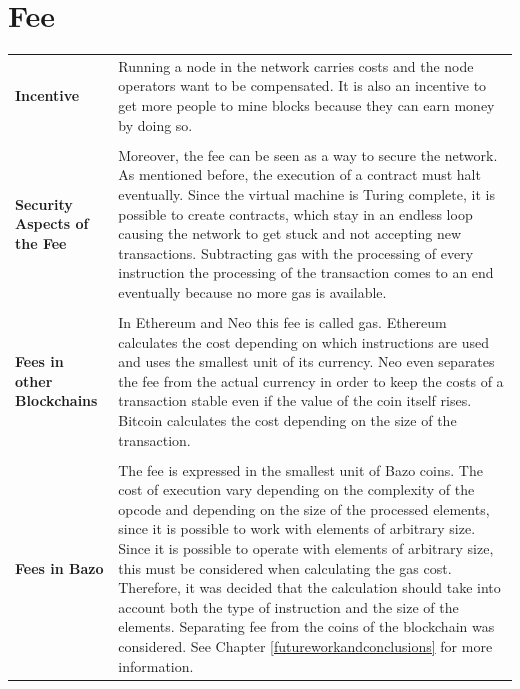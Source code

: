 \section{Fee} \label{fee}
\begin{tabular}[t]{ p{3cm} p{12.5cm}}
\raggedright
\textbf{Incentive} &
Running a node in the network carries costs and the node operators want to be compensated. It is also an incentive to get more people to mine blocks because they can earn money by doing so. \\ \\

\raggedright
\textbf{Security Aspects of the Fee} &
Moreover, the fee can be seen as a way to secure the network. As mentioned before, the execution of a contract must halt eventually. Since the virtual machine is Turing complete, it is possible to create contracts, which stay in an endless loop causing the network to get stuck and not accepting new transactions. Subtracting gas with the processing of every instruction the processing of the transaction comes to an end eventually because no more gas is available. \\ \\

\raggedright
\textbf{Fees in other Blockchains} &
In Ethereum and Neo this fee is called gas. Ethereum calculates the cost depending on which instructions are used and uses the smallest unit of its currency. Neo even separates the fee from the actual currency in order to keep the costs of a transaction stable even if the value of the coin itself rises. Bitcoin calculates the cost depending on the size of the transaction. \\ \\

\raggedright
\textbf{Fees in Bazo} &
The fee is expressed in the smallest unit of Bazo coins. The cost of execution vary depending on the complexity of the opcode and depending on the size of the processed elements, since it is possible to work with elements of arbitrary size. Since it is possible to operate with elements of arbitrary size, this must be considered when calculating the gas cost. Therefore, it was decided that the calculation should take into account both the type of instruction and the size of the elements. Separating fee from the coins of the blockchain was considered. See Chapter \ref{futureworkandconclusions} for more information.
\end{tabular}

